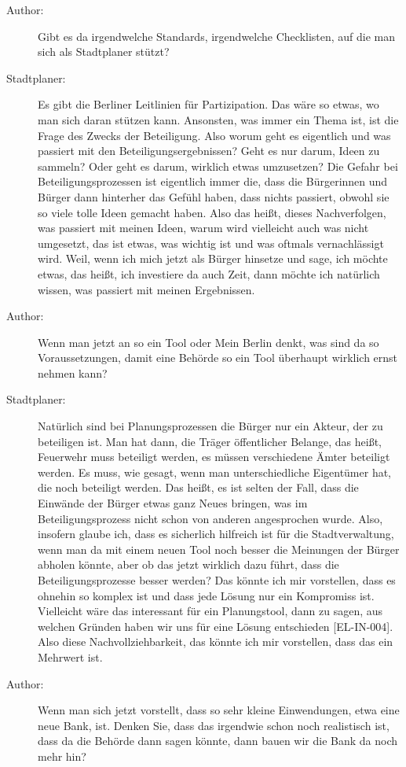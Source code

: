 \begin{description}
\item[Author:] Gibt es da irgendwelche Standards, irgendwelche Checklisten, auf die man sich als Stadtplaner stützt?
\item[Stadtplaner:] Es gibt die Berliner Leitlinien für Partizipation. Das wäre so etwas, wo man sich daran stützen kann. Ansonsten, was immer ein Thema ist, ist die Frage des Zwecks der Beteiligung. Also worum geht es eigentlich und was passiert mit den Beteiligungsergebnissen? Geht es nur darum, Ideen zu sammeln? Oder geht es darum, wirklich etwas umzusetzen? Die Gefahr bei Beteiligungsprozessen ist eigentlich immer die, dass die Bürgerinnen und Bürger dann hinterher das Gefühl haben, dass nichts passiert, obwohl sie so viele tolle Ideen gemacht haben. Also das heißt, dieses Nachverfolgen, was passiert mit meinen Ideen, warum wird vielleicht auch was nicht umgesetzt, das ist etwas, was wichtig ist und was oftmals vernachlässigt wird. Weil, wenn ich mich jetzt als Bürger hinsetze und sage, ich möchte etwas, das heißt, ich investiere da auch Zeit, dann möchte ich natürlich wissen, was passiert mit meinen Ergebnissen.
\item[Author:] Wenn man jetzt an so ein Tool oder Mein Berlin denkt, was sind da so Voraussetzungen, damit eine Behörde so ein Tool überhaupt wirklich ernst nehmen kann?
\item[Stadtplaner:] Natürlich sind bei Planungsprozessen die Bürger nur ein Akteur, der zu beteiligen ist. Man hat dann, die Träger öffentlicher Belange, das heißt, Feuerwehr muss beteiligt werden, es müssen verschiedene Ämter beteiligt werden. Es muss, wie gesagt, wenn man unterschiedliche Eigentümer hat, die noch beteiligt werden. Das heißt, es ist selten der Fall, dass die Einwände der Bürger etwas ganz Neues bringen, was im Beteiligungsprozess nicht schon von anderen angesprochen wurde. Also, insofern glaube ich, dass es sicherlich hilfreich ist für die Stadtverwaltung, wenn man da mit einem neuen Tool noch besser die Meinungen der Bürger abholen könnte, aber ob das jetzt wirklich dazu führt, dass die Beteiligungsprozesse besser werden? Das könnte ich mir vorstellen, dass es ohnehin so komplex ist und dass jede Lösung nur ein Kompromiss ist. Vielleicht wäre das interessant für ein Planungstool, dann zu sagen, aus welchen Gründen haben wir uns für eine Lösung entschieden [EL-IN-004]. Also diese Nachvollziehbarkeit, das könnte ich mir vorstellen, dass das ein Mehrwert ist.
\item[Author:] Wenn man sich jetzt vorstellt, dass so sehr kleine Einwendungen, etwa eine neue Bank, ist. Denken Sie, dass das irgendwie schon noch realistisch ist, dass da die Behörde dann sagen könnte, dann bauen wir die Bank da noch mehr hin?

\end{description}
